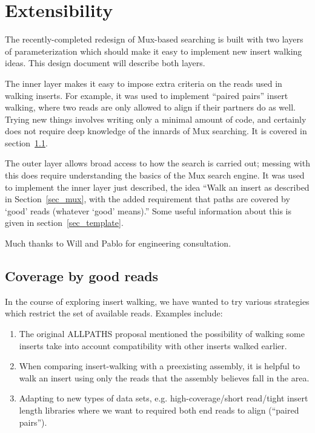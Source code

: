 \documentclass[11pt]{article}
\begin{document}
\section{Extensibility}
\label{sec_ext}

The recently-completed redesign of Mux-based searching is built with two 
layers of parameterization which should make it easy to implement new
insert walking ideas.  This design document will describe both layers.

The inner layer makes it easy to impose extra criteria on the reads used in
walking inserts.  For example, it was used to implement ``paired pairs'' insert
walking, where two reads are only allowed to align if their partners do as well.
Trying new things involves writing only a minimal amount of code, and certainly
does not require deep knowledge of the innards of Mux searching.
It is covered in section~\ref{sec_goodreads}.

The outer layer allows broad access to how the search is carried out; messing
with this does require understanding the basics of the Mux search engine.
It was used to implement the inner layer just described, the idea ``Walk an insert 
as described in Section~\ref{sec_mux}, with the added requirement that 
paths are covered by `good' reads (whatever `good' means).''  Some useful
information about this is given in section~\ref{sec_template}.

Much thanks to Will and Pablo for engineering consultation.


\subsection{Coverage by good reads}
\label{sec_goodreads}


In the course of exploring insert walking, we have wanted to try various strategies
which restrict the set of available reads.  Examples include:
\begin{enumerate}
\item
The original ALLPATHS proposal mentioned the possibility of walking some 
inserts take into account compatibility with other inserts walked earlier. 
\item
When comparing insert-walking with a preexisting assembly, it is helpful to walk
an insert using only the reads that the assembly believes fall in the area.
\item
Adapting to new types of data sets, e.g. high-coverage/short read/tight insert length libraries
where we want to required both end reads to align (``paired pairs'').
\end{enumerate}
\end{document}
